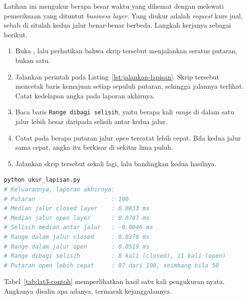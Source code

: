 Latihan ini mengukur berapa besar waktu yang dihemat dengan melewati
pemeriksaan yang dituntut \textit{business layer}. Yang diukur adalah \textit{request} kurs
jual, sebab di situlah kedua jalur benar-benar berbeda. Langkah kerjanya
sebagai berikut.

\begin{enumerate}
  \item Buka , lalu perhatikan bahwa
    skrip tersebut menjalankan seratus putaran, bukan satu.
  \item Jalankan perintah pada Listing~\ref{lst:jalankan-lapisan}. Skrip tersebut
    mencetak baris kemajuan setiap sepuluh putaran, sehingga jalannya terlihat.
    Catat kedelapan angka pada laporan akhirnya.
  \item Baca baris \texttt{Range dibagi selisih}, yaitu berapa kali \textit{range} di
    dalam satu jalur lebih besar daripada selisih antar kedua jalur.
  \item Catat pada berapa putaran jalur \textit{open} tercatat lebih cepat. Bila
    kedua jalur sama cepat, angka itu berkisar di sekitar lima puluh.
  \item Jalankan skrip tersebut sekali lagi, lalu bandingkan kedua hasilnya.
\end{enumerate}

\begin{lstlisting}[language=bash, caption={Mengukur biaya satu \textit{hop}, skrip
  tersedia di \berkas{sources/chapter02/ukur_lapisan.py}},
  label=lst:jalankan-lapisan]
python ukur_lapisan.py
# Keluarannya, laporan akhirnya:
# Putaran                      : 100
# Median jalur closed layer    : 0.0833 ms
# Median jalur open layer      : 0.0787 ms
# Selisih median antar jalur   : -0.0046 ms
# Range dalam jalur closed     : 0.0376 ms
# Range dalam jalur open       : 0.0519 ms
# Range dibagi selisih         : 8 kali (closed), 11 kali (open)
# Putaran open lebih cepat     : 97 dari 100, seimbang bila 50
\end{lstlisting}

Tabel~\ref{tab:lat3-contoh} memperlihatkan hasil satu kali pengukuran nyata.
Angkanya disalin apa adanya, termasuk kejanggalannya.

